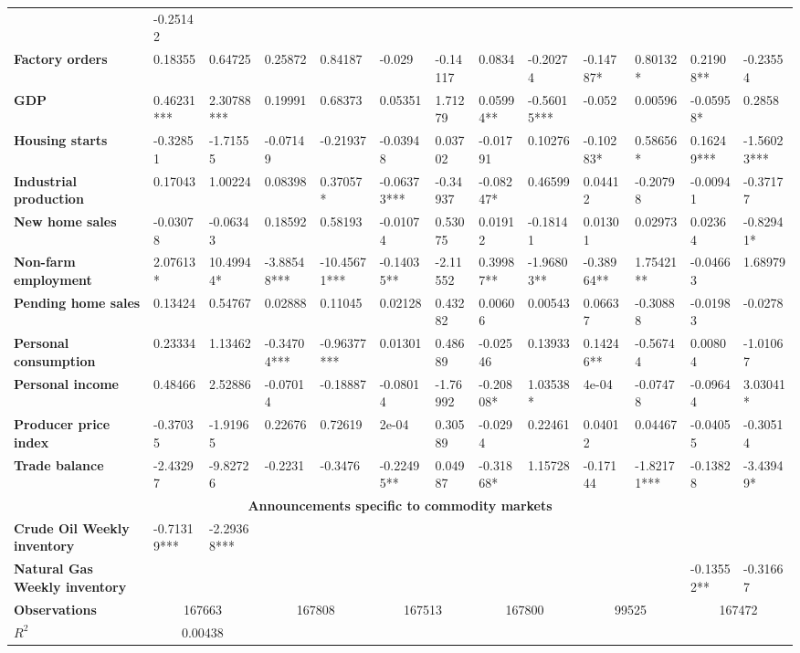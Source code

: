 \begin{sidewaystable}
{\begin{tabular}{@{}lllllllllllll@{}}
& -0.25142 \\ \textbf{Factory orders}& 0.18355 & 0.64725 & 0.25872 & 0.84187 & -0.029 & -0.14117 & 0.0834 & -0.20274 & -0.14787* & 0.80132* & 0.21908** & -0.23554 \\ \textbf{GDP}& 0.46231*** & 2.30788*** & 0.19991 & 0.68373 & 0.05351 & 1.71279 & 0.05994** & -0.56015*** & -0.052 & 0.00596 & -0.05958* & 0.2858 \\ \textbf{Housing starts}& -0.32851 & -1.71555 & -0.07149 & -0.21937 & -0.03948 & 0.03702 & -0.01791 & 0.10276 & -0.10283* & 0.58656* & 0.16249*** & -1.56023*** \\ \textbf{Industrial production}& 0.17043 & 1.00224 & 0.08398 & 0.37057* & -0.06373*** & -0.34937 & -0.08247* & 0.46599 & 0.04412 & -0.20798 & -0.00941 & -0.37177 \\ \textbf{New home sales}& -0.03078 & -0.06343 & 0.18592 & 0.58193 & -0.01074 & 0.53075 & 0.01912 & -0.18141 & 0.01301 & 0.02973 & 0.02364 & -0.82941* \\ \textbf{Non-farm employment}& 2.07613*& 10.49944*& -3.88548*** & -10.45671*** & -0.14035** & -2.11552 & 0.39987** & -1.96803** & -0.38964** & 1.75421** & -0.04663 & 1.68979 \\ \textbf{Pending home sales}& 0.13424 & 0.54767 & 0.02888 & 0.11045 & 0.02128 & 0.43282 & 0.00606 & 0.00543 & 0.06637 & -0.30888 & -0.01983 & -0.0278 \\ \textbf{Personal consumption}& 0.23334 & 1.13462 & -0.34704*** & -0.96377*** & 0.01301 & 0.48689 & -0.02546 & 0.13933 & 0.14246** & -0.56744 & 0.00804 & -1.01067 \\ \textbf{Personal income}& 0.48466 & 2.52886 & -0.07014 & -0.18887 & -0.08014 & -1.76992 & -0.20808* & 1.03538* & 4e-04 & -0.07478 & -0.09644 & 3.03041* \\ \textbf{Producer price index}& -0.37035 & -1.91965 & 0.22676 & 0.72619 & 2e-04 & 0.30589 & -0.0294 & 0.22461 & 0.04012 & 0.04467 & -0.04055 & -0.30514 \\ \textbf{Trade balance}& -2.43297 & -9.82726 & -0.2231 & -0.3476 & -0.22495** & 0.04987 & -0.31868* & 1.15728 & -0.17144 & -1.82171*** & -0.13828 & -3.43949* \\  \midrule \multicolumn{13}{c}{\textbf{Announcements specific to commodity markets}} \\ \midrule \textbf{Crude Oil Weekly inventory}& -0.71319*** & -2.29368*** &  &  &  &  &  &  &  &  &  &  \\ \textbf{Natural Gas Weekly inventory}&  &  &  &  &  &  &  &  &  &  & -0.13552** & -0.31667 \\  \midrule \textbf{Observations}             &\multicolumn{2}{c}{ 167663 }                                                 & \multicolumn{2}{c}{ 167808 }                                                 & \multicolumn{2}{c}{ 167513 }                                                 & \multicolumn{2}{c}{ 167800 }                                                 & \multicolumn{2}{c}{ 99525 }                                                   & \multicolumn{2}{c}{ 167472 }                                                 \\ \textbf{$R^2$}             &\multicolumn{2}{c}{ 0.00438 }           
\end{tabular}}
\end{sidewaystable}
